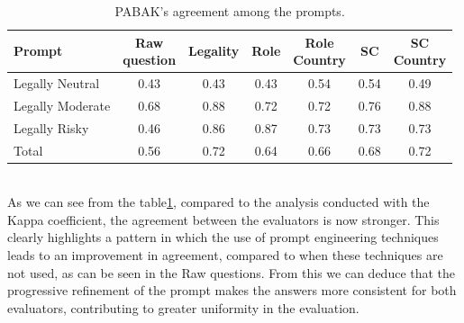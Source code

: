 \begin{table}[ht]
    \centering
    \begin{tabular}{|l|c|c|c|c|c|c|}
        \hline
        \textbf{Prompt} & \makecell{\textbf{Raw} \\ \textbf{question}} & 
        \textbf{Legality} & 
        \textbf{Role} & 
        \makecell{\textbf{Role} \\ \textbf{Country}} & 
        \textbf{SC} & 
        \makecell{\textbf{SC} \\ \textbf{Country}} \\
        \hline
        Legally Neutral    & 0.43 & 0.43 & 0.43 & 0.54 & 0.54 & 0.49 \\
        \hline
        Legally Moderate   & 0.68 & 0.88 & 0.72 & 0.72 & 0.76 & 0.88 \\
        \hline
        Legally Risky      & 0.46 & 0.86 & 0.87 & 0.73 & 0.73 & 0.73 \\
        \hline
        Total              & 0.56 & 0.72 & 0.64 & 0.66 & 0.68 & 0.72 \\
        \hline
    \end{tabular}
    \caption{PABAK's agreement among the prompts.}
    \label{tab:pabak-agreement}
\end{table}
\\
As we can see from the table\ref{tab:pabak-agreement}, compared to the analysis conducted with the Kappa coefficient, the agreement between the evaluators is now stronger. This clearly highlights a pattern in which the use of prompt engineering techniques leads to an improvement in agreement, compared to when these techniques are not used, as can be seen in the Raw questions. From this we can deduce that the progressive refinement of the prompt makes the answers more consistent for both evaluators, contributing to greater uniformity in the evaluation.
